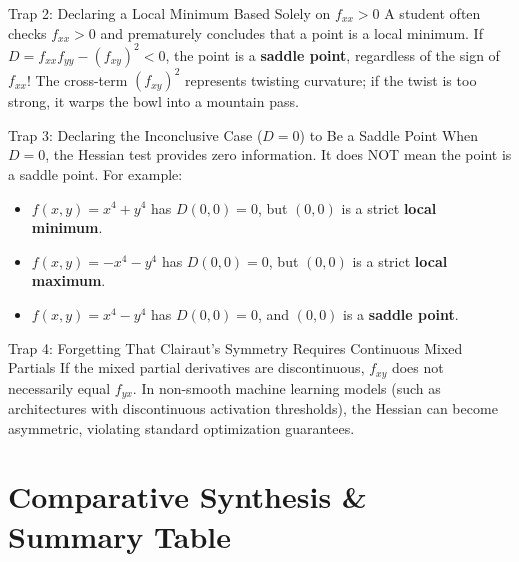 \begin{trapbox}{Trap 2: Declaring a Local Minimum Based Solely on $f_{xx} > 0$}
A student often checks $f_{xx} > 0$ and prematurely concludes that a point is a local minimum. If $D = f_{xx} f_{yy} - (f_{xy})^2 < 0$, the point is a \textbf{saddle point}, regardless of the sign of $f_{xx}$! The cross-term $(f_{xy})^2$ represents twisting curvature; if the twist is too strong, it warps the bowl into a mountain pass.
\end{trapbox}

\begin{trapbox}{Trap 3: Declaring the Inconclusive Case ($D = 0$) to Be a Saddle Point}
When $D = 0$, the Hessian test provides zero information. It does NOT mean the point is a saddle point. For example:
\begin{itemize}
    \item $f(x, y) = x^4 + y^4$ has $D(0, 0) = 0$, but $(0, 0)$ is a strict \textbf{local minimum}.
    \item $f(x, y) = -x^4 - y^4$ has $D(0, 0) = 0$, but $(0, 0)$ is a strict \textbf{local maximum}.
    \item $f(x, y) = x^4 - y^4$ has $D(0, 0) = 0$, and $(0, 0)$ is a \textbf{saddle point}.
\end{itemize}
\end{trapbox}

\begin{trapbox}{Trap 4: Forgetting That Clairaut's Symmetry Requires Continuous Mixed Partials}
If the mixed partial derivatives are discontinuous, $f_{xy}$ does not necessarily equal $f_{yx}$. In non-smooth machine learning models (such as architectures with discontinuous activation thresholds), the Hessian can become asymmetric, violating standard optimization guarantees.
\end{trapbox}

\section{Comparative Synthesis \& Summary Table}

